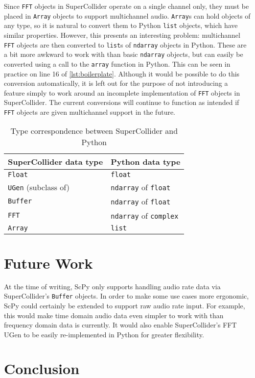 \documentclass{article}
\begin{document}
Since \texttt{FFT} objects in SuperCollider operate on a single channel only, they must be placed
in \texttt{Array} objects to support multichannel audio. \texttt{Array}s can hold objects of any
type, so it is natural to convert them to Python \texttt{list} objects, which have similar
properties. However, this presents an interesting problem: multichannel \texttt{FFT} objects are
then converted to \texttt{list}s of \texttt{ndarray} objects in Python. These are a bit more
awkward to work with than basic \texttt{ndarray} objects, but can easily be converted using a call
to the \texttt{array} function in Python. This can be seen in practice on line 16 of
\autoref{lst:boilerplate}. Although it would be possible to do this conversion
automatically, it is left out for the purpose of not introducing a feature simply to work around an
incomplete implementation of \texttt{FFT} objects in SuperCollider. The current conversions will
continue to function as intended if \texttt{FFT} objects are given multichannel support in the
future.

\begin{table}[H]
    \caption{Type correspondence between SuperCollider and Python}
    \begin{center}
        \begin{tabular}{| l | l |}
            \hline
            SuperCollider data type & Python data type \\ \hline
            \texttt{Float} & \texttt{float} \\ \hline
            \texttt{UGen} (subclass of) & \texttt{ndarray} of \texttt{float} \\ \hline
            \texttt{Buffer} & \texttt{ndarray} of \texttt{float} \\ \hline
            \texttt{FFT} & \texttt{ndarray} of \texttt{complex} \\ \hline
            \texttt{Array} & \texttt{list} \\ \hline
        \end{tabular}
    \end{center}
\end{table}

\section{Future Work}

At the time of writing, ScPy only supports handling audio rate data via SuperCollider's
\texttt{Buffer} objects. In order to make some use cases more ergonomic, ScPy could certainly be
extended to support raw audio rate input. For example, this would make time domain audio data even
simpler to work with than frequency domain data is currently. It would also enable SuperCollider's
FFT UGen to be easily re-implemented in Python for greater flexibility.

\section{Conclusion}

\printbibliography
\end{document}
